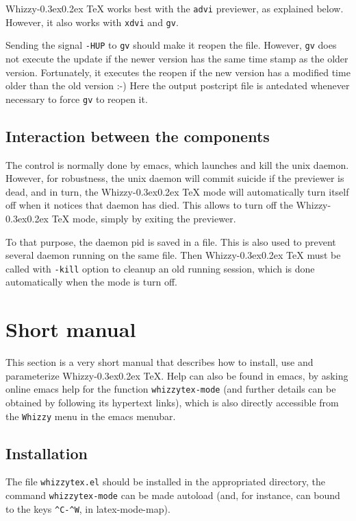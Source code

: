 \documentclass{article}
\let \lst \verb
\def \whizzy{{Whizzy\kern -0.3ex\raise 0.2ex \hbox{\TeX}}}
\begin{document}
{\whizzy} works best with the \lst"advi" previewer, as explained below. 
However, it also works with \lst"xdvi" and \lst"gv". 

Sending the signal \lst"-HUP" to \lst"gv" should make it reopen the file.
However, \lst"gv" does not execute the update if the newer version has the
same time stamp as the older version. Fortunately, it executes the reopen if
the new version has a modified time older than the old version :-) Here the
output postcript file  is antedated whenever necessary to force \lst"gv"
to reopen it.


\subsection {Interaction between the components} 

The control is normally done by emacs, which launches and kill the unix
daemon. However, for robustness, the unix daemon will commit suicide if the
previewer is dead, and in turn, the {\whizzy} mode will automatically turn
itself off when it notices that daemon has died. This allows to turn off
the {\whizzy} mode, simply by exiting the previewer.

To that purpose, the daemon pid is saved in a file. 
This is also used to prevent several daemon running on the same file. 
Then {\whizzy} must be called with \lst"-kill" option to cleanup an  old
running session, which is done automatically when the mode is turn off.


\section {Short manual} 
This section is a very short manual that describes how to install, use and
parameterize {\whizzy}. Help can also be found in emacs, by asking online
emacs help for the function \lst"whizzytex-mode" (and further details can be
obtained by following its hypertext links), which is also directly
accessible from the \lst"Whizzy" menu in the emacs menubar.

\subsection {Installation}

The file \lst"whizzytex.el" should be installed in the appropriated
directory, the command \lst"whizzytex-mode" can be made autoload (and, for
instance, can bound to the keys \lst"^C-^W", in latex-mode-map).
\end{document}
